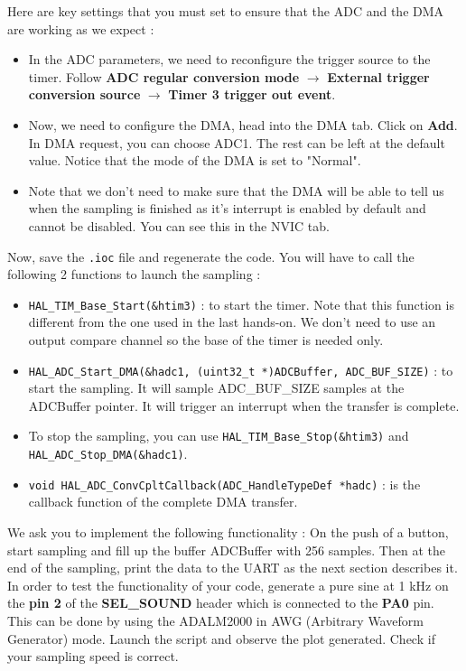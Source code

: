 \noindent Here are key settings that you must set to ensure that the ADC and the DMA are working as we expect :
\begin{itemize}
    \item In the ADC parameters, we need to reconfigure the trigger source to the timer. Follow \textbf{ADC regular conversion mode} $\rightarrow$ \textbf{External trigger conversion source} $\rightarrow$ \textbf{Timer 3 trigger out event}.
    \item Now, we need to configure the DMA, head into the DMA tab. Click on \textbf{Add}. In DMA request, you can choose ADC1. The rest can be left at the default value. Notice that the mode of the DMA is set to "Normal".
    \item Note that we don't need to make sure that the DMA will be able to tell us when the sampling is finished as it's interrupt is enabled by default and cannot be disabled. You can see this in the NVIC tab.
\end{itemize}
\noindent Now, save the \texttt{.ioc} file and regenerate the code. You will have to call the following 2 functions to launch the sampling :
\begin{itemize}
    \item \texttt{HAL\_TIM\_Base\_Start(\&htim3)} : to start the timer. Note that this function is different from the one used in the last hands-on. We don't need to use an output compare channel so the base of the timer is needed only.
    \item \texttt{HAL\_ADC\_Start\_DMA(\&hadc1, (uint32\_t *)ADCBuffer, ADC\_BUF\_SIZE)} : to start the sampling. It will sample ADC\_BUF\_SIZE samples at the ADCBuffer pointer. It will trigger an interrupt when the transfer is complete.
    \item To stop the sampling, you can use \texttt{HAL\_TIM\_Base\_Stop(\&htim3)} and \texttt{HAL\_ADC\_Stop\_DMA(\&hadc1)}.
    \item \texttt{void HAL\_ADC\_ConvCpltCallback(ADC\_HandleTypeDef *hadc)} : is the callback function of the complete DMA transfer.
\end{itemize}

\noindent We ask you to implement the following functionality : On the push of a button, start sampling and fill up the buffer ADCBuffer with 256 samples. Then at the end of the sampling, print the data to the UART as the next section describes it. In order to test the functionality of your code, generate a pure sine at 1 kHz on the \textbf{pin 2} of the \textbf{SEL\_SOUND} header which is connected to the \textbf{PA0} pin. This can be done by using the ADALM2000 in AWG (Arbitrary Waveform Generator) mode. Launch the script and observe the plot generated. Check if your sampling speed is correct.


